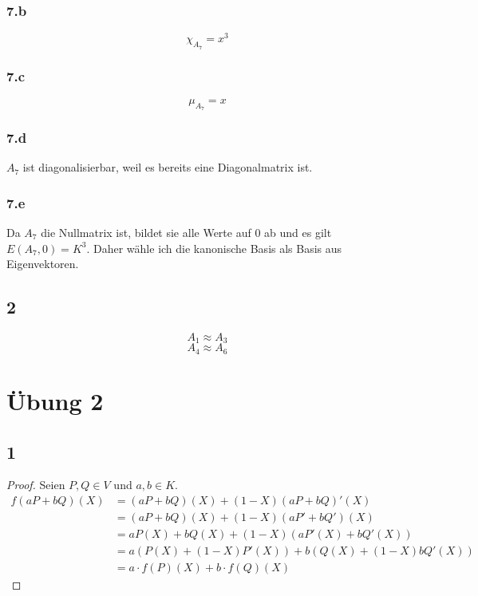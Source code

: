 \documentclass[10pt,a4paper]{article}
\begin{document}
\subsubsection*{7.b}

\begin{equation}
\chi_{A_{7}} = x^{3}
\end{equation}

\subsubsection*{7.c}

\begin{equation}
\mu_{A_{7}} = x
\end{equation}

\subsubsection*{7.d}

$A_{7}$ ist diagonalisierbar, weil es bereits eine Diagonalmatrix ist.

\subsubsection*{7.e}

Da $A_{7}$ die Nullmatrix ist, bildet sie alle Werte auf $0$ ab und es gilt $E(A_{7}, 0) = K^{3}$.
Daher wähle ich die kanonische Basis als Basis aus Eigenvektoren.

\subsection*{2}

\begin{equation}
A_{1} \approx A_{3}
\end{equation}
\begin{equation}
A_{4} \approx A_{6}
\end{equation}

\section*{Übung 2}

\subsection*{1}

\begin{proof}
Seien $P, Q \in V$ und $a, b \in K$.
\begin{align}
f(aP + bQ)(X) & = (aP + bQ)(X) + (1 - X)(aP + bQ)'(X)\\
& = (aP + bQ)(X) + (1 - X)(aP' + bQ')(X)\\
& = aP(X) + bQ(X) + (1 - X) \left( aP'(X) + bQ'(X) \right)\\
& = a \left( P(X) + (1 - X)P'(X) \right) + b \left( Q(X) + (1 - X)bQ'(X) \right)\\
& = a \cdot f(P)(X) + b \cdot f(Q)(X)
\end{align}
\end{proof}
\end{document}
